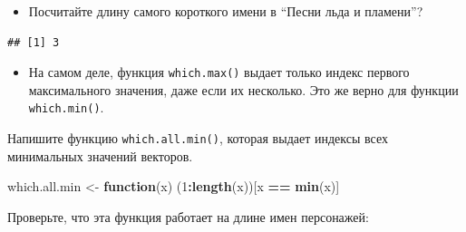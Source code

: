 \documentclass[]{book}
\newenvironment{Shaded}{\begin{snugshade}}{\end{snugshade}}
\newcommand{\KeywordTok}[1]{\textcolor[rgb]{0.13,0.29,0.53}{\textbf{#1}}}
\newcommand{\DecValTok}[1]{\textcolor[rgb]{0.00,0.00,0.81}{#1}}
\newcommand{\StringTok}[1]{\textcolor[rgb]{0.31,0.60,0.02}{#1}}
\newcommand{\ControlFlowTok}[1]{\textcolor[rgb]{0.13,0.29,0.53}{\textbf{#1}}}
\newcommand{\OperatorTok}[1]{\textcolor[rgb]{0.81,0.36,0.00}{\textbf{#1}}}
\newcommand{\NormalTok}[1]{#1}
\providecommand{\tightlist}{%
  \setlength{\itemsep}{0pt}\setlength{\parskip}{0pt}}
\begin{document}
\begin{itemize}
\tightlist
\item
  Посчитайте длину самого короткого имени в ``Песни льда и пламени''?
\end{itemize}

\begin{Shaded}
\end{Shaded}

\begin{verbatim}
## [1] 3
\end{verbatim}

\begin{itemize}
\tightlist
\item
  На самом деле, функция \texttt{which.max()} выдает только индекс
  первого максимального значения, даже если их несколько. Это же верно
  для функции \texttt{which.min()}.
\end{itemize}

Напишите функцию \texttt{which.all.min()}, которая выдает индексы всех
минимальных значений векторов.

\begin{Shaded}
\begin{Highlighting}[]
\NormalTok{which.all.min <-}\StringTok{ }\ControlFlowTok{function}\NormalTok{(x) (}\DecValTok{1}\OperatorTok{:}\KeywordTok{length}\NormalTok{(x))[x }\OperatorTok{==}\StringTok{ }\KeywordTok{min}\NormalTok{(x)]}
\end{Highlighting}
\end{Shaded}

Проверьте, что эта функция работает на длине имен персонажей:

\begin{Shaded}
\end{Shaded}
\end{document}
